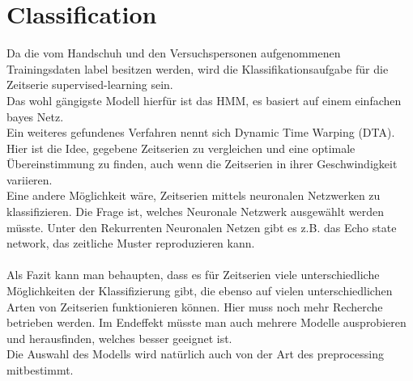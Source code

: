 \documentclass[]{report}
\begin{document}
\section*{Classification}
Da die vom Handschuh und den Versuchspersonen aufgenommenen Trainingsdaten label besitzen werden, wird die Klassifikationsaufgabe für die Zeitserie supervised-learning sein.\\
Das wohl gängigste Modell hierfür ist das HMM, es basiert auf einem einfachen bayes Netz. \\
Ein weiteres gefundenes Verfahren nennt sich Dynamic Time Warping (DTA). Hier ist die Idee, gegebene Zeitserien zu vergleichen und eine optimale Übereinstimmung zu finden, auch wenn die Zeitserien in ihrer Geschwindigkeit variieren.
\\
Eine andere Möglichkeit wäre, Zeitserien mittels neuronalen Netzwerken zu klassifizieren. Die Frage ist, welches Neuronale Netzwerk ausgewählt werden müsste. Unter den Rekurrenten Neuronalen Netzen gibt es z.B. das Echo state network, das zeitliche Muster reproduzieren kann.
\\\\
Als Fazit kann man behaupten, dass es für Zeitserien viele unterschiedliche Möglichkeiten der Klassifizierung gibt, die ebenso auf vielen unterschiedlichen Arten von Zeitserien funktionieren können. Hier muss noch mehr Recherche betrieben werden. Im Endeffekt müsste man auch mehrere Modelle ausprobieren und herausfinden, welches besser geeignet ist. \\
Die Auswahl des Modells wird natürlich auch von der Art des preprocessing mitbestimmt.
\end{document}
